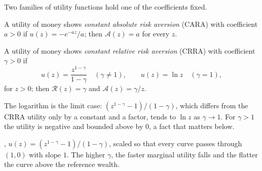 Two families of utility functions hold one of the coefficients fixed.

\begin{definition}\label{def:b2:expected-utility:cara}
A utility of money shows \emph{constant absolute risk aversion}
(CARA) with coefficient $a > 0$ if $u(z) = -e^{-az}/a$; then $\mathcal{A}(z) = a$ for every $z$.
\end{definition}

\begin{definition}\label{def:b2:expected-utility:crra}
A utility of money shows \emph{constant relative risk aversion}
(CRRA) with coefficient $\gamma > 0$ if
\[
u(z) = \frac{z^{1-\gamma}}{1-\gamma} \quad (\gamma \ne 1), \qquad u(z) = \ln z \quad (\gamma = 1),
\]
for $z > 0$; then $\mathcal{R}(z) = \gamma$ and $\mathcal{A}(z) = \gamma / z$.
\end{definition}

The logarithm is the limit case: $(z^{1-\gamma} - 1)/(1-\gamma)$, which differs from the CRRA utility
only by a constant and a factor, tends to $\ln z$ as $\gamma \to 1$. For $\gamma > 1$ the utility is
negative and bounded above by $0$, a fact that matters below.

\begin{omfigure}

{\small {}, $u(z) = (z^{1-\gamma} - 1)/(1-\gamma)$, scaled so that every
curve passes through $(1, 0)$ with slope $1$. The higher $\gamma$, the faster marginal utility falls
and the flatter the curve above the reference wealth.}
\end{omfigure}


